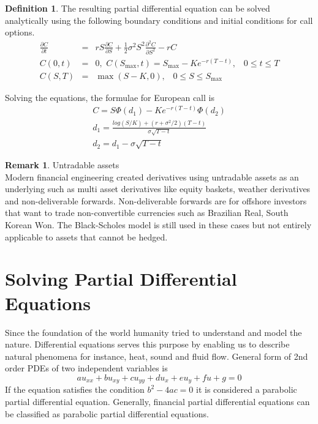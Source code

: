 \documentclass[12pt, oneside]{book}
\theoremstyle{plain}
\theoremstyle{definition}
\newtheorem{definition}[theorem]{Definition}
\newtheorem{remark}[theorem]{Remark}
\begin{document}
\begin{definition} The resulting partial differential equation can be solved analytically using the following boundary conditions and initial conditions for call options.
\begin{eqnarray}
\frac{\partial C}{\partial t} &=& rS\frac{\partial C}{\partial S}+\frac{1}{2} \sigma^2 S^2 \frac{\partial^2 C}{\partial S^2} - rC \\[10pt]
C(0,t) &=& 0, \hspace{4pt} C(S_{\max},t)=S_{\max} - K e^{-r(T-t)}, \hspace{10pt} 0 \leq t \leq T \\[10pt]
C(S,T) &=& \max(S-K,0), \hspace{10pt} 0 \leq S \leq S_{\max}
\end{eqnarray}

Solving the equations, the formulae \cite{wilmott} for European call is
\begin{eqnarray}
C = S \Phi (d_1) - K e^{-r(T-t)} \Phi (d_2) \\[10pt]
d_1 = \frac{log(S/K) + (r + \sigma^2/2)(T - t)}{\sigma \sqrt{T-t}} \\[10pt]
d_2 = d_1 - \sigma \sqrt{T-t}
\end{eqnarray}

\end{definition}

\begin{remark}  Untradable assets\\ 
Modern financial engineering created derivatives using untradable assets as an underlying such as multi asset derivatives like equity baskets, weather derivatives and non-deliverable forwards. Non-deliverable forwards are for offshore investors that want to trade non-convertible currencies such as Brazilian Real, South Korean Won.  The Black-Scholes model is still used in these cases \cite{weather} \cite{basket} but not entirely applicable to assets that cannot be hedged.
\end{remark}


\section{Solving Partial Differential Equations}
Since the foundation of the world humanity tried to understand and model the nature. Differential equations serves this purpose by enabling us to describe natural phenomena for instance, heat, sound and fluid flow. General form of 2nd order PDEs of two independent variables is $$ au_{xx} + bu_{xy} + cu_{yy} + du_x + eu_y + fu + g = 0 $$ If the equation satisfies the condition $ b^2 - 4ac = 0 $  it is considered a parabolic partial differential equation. Generally, financial partial differential equations can be classified as parabolic partial differential equations.
\end{document}
